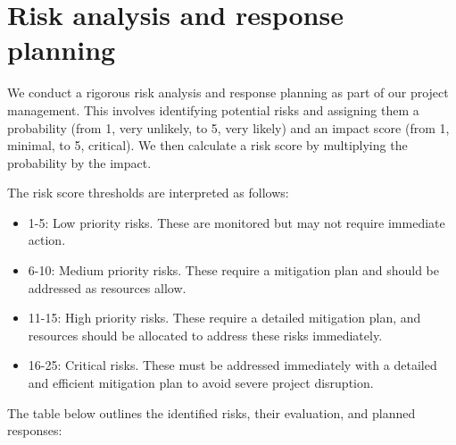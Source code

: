 \documentclass[10pt]{projectdoc}
\begin{document}
\newpage
\section{Risk analysis and response planning}
We conduct a rigorous risk analysis and response planning as part of our project management. This involves identifying potential risks and assigning them a probability (from 1, very unlikely, to 5, very likely) and an impact score (from 1, minimal, to 5, critical). We then calculate a risk score by multiplying the probability by the impact. 

The risk score thresholds are interpreted as follows:
\begin{itemize}
\item 1-5: Low priority risks. These are monitored but may not require immediate action.
\item 6-10: Medium priority risks. These require a mitigation plan and should be addressed as resources allow.
\item 11-15: High priority risks. These require a detailed mitigation plan, and resources should be allocated to address these risks immediately.
\item 16-25: Critical risks. These must be addressed immediately with a detailed and efficient mitigation plan to avoid severe project disruption.
\end{itemize}

The table below outlines the identified risks, their evaluation, and planned responses:

\begin{table}[H]
    \centering
    \end{table}
\end{document}
